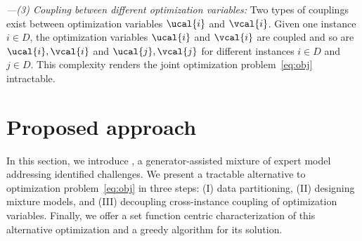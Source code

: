 \documentclass[letterpaper]{article}
\begin{document}
%
\noindent\emph{---(3) Coupling between different optimization variables:} 
Two types of couplings exist between optimization variables $\ucal{i}$ and $\vcal{i}$. Given one instance $i\in D$, the optimization variables $\ucal{i}$ and $\vcal{i}$ are coupled and so are $\ucal{i}, \vcal{i}$ and $\ucal{j}, \vcal{j}$ for different instances $i\in D$ and $j\in D$.
This complexity renders the joint optimization problem~\eqref{eq:obj} intractable.  



\section{Proposed approach}
In this section, we introduce \our, a generator-assisted mixture of expert model addressing identified challenges. We present a tractable alternative to optimization problem~\eqref{eq:obj} in three steps: (I) data partitioning, (II) designing mixture models, and (III) decoupling cross-instance coupling of optimization variables. Finally, we offer a set   function centric characterization of this alternative optimization and a greedy algorithm for its solution.




\end{document}
